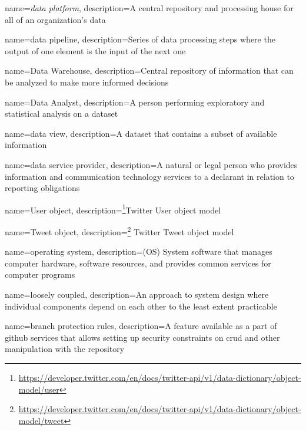 {
    name={\textit{data platform}},
    description={A central repository and processing house for all of an organization's data}
}

{
    name={data pipeline},
    description={Series of data processing steps where the output of one element is the input of the next one}
}

{
    name={Data Warehouse},
    description={Central repository of information that can be analyzed to make more informed decisions}
}

{
    name={Data Analyst},
    description={A person performing exploratory and statistical analysis on a dataset}
}

{
    name={data view},
    description={A dataset that contains a subset of available information}
}

{
    name={data service provider},
    description={A natural or legal person who provides information and communication technology services to a declarant in relation to reporting obligations \cite{law_insider_2022}}
}

{
    name={User object},
    description={\footnote{\href{https://developer.twitter.com/en/docs/twitter-api/v1/data-dictionary/object-model/user}{https://developer.twitter.com/en/docs/twitter-api/v1/data-dictionary/object-model/user}}Twitter User object model}
}

{
    name={Tweet object},
    description={\footnote{\href{https://developer.twitter.com/en/docs/twitter-api/v1/data-dictionary/object-model/tweet}{https://developer.twitter.com/en/docs/twitter-api/v1/data-dictionary/object-model/tweet}} Twitter Tweet object model}
}

{
    name={operating system},
    description={(OS) System software that manages computer hardware, software resources, and provides common services for computer programs}
}

{
    name={loosely coupled},
    description={An approach to system design where individual components depend on each other to the least extent practicable}
}

{
    name={branch protection rules},
    description={A feature available as a part of \gls{github} services that allows setting up security constraints on \acrshort{crud} and other manipulation with the repository}
}

